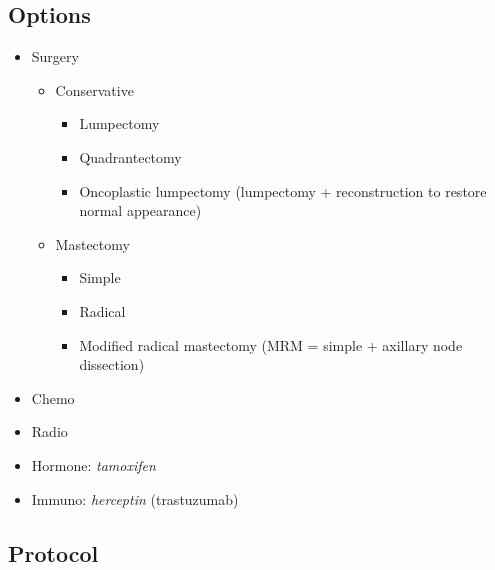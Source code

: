\documentclass[
  14pt,
]{memoir}
\providecommand{\tightlist}{%
  \setlength{\itemsep}{0pt}\setlength{\parskip}{0pt}}
\begin{document}
\hypertarget{options}{%
\subsection{Options}\label{options}}

\begin{itemize}
\tightlist
\item
  Surgery

  \begin{itemize}
  \tightlist
  \item
    Conservative

    \begin{itemize}
    \tightlist
    \item
      Lumpectomy
    \item
      Quadrantectomy
    \item
      Oncoplastic lumpectomy (lumpectomy + reconstruction to restore
      normal appearance)
    \end{itemize}
  \item
    Mastectomy

    \begin{itemize}
    \tightlist
    \item
      Simple
    \item
      Radical
    \item
      Modified radical mastectomy (MRM = simple + axillary node
      dissection)
    \end{itemize}
  \end{itemize}
\item
  Chemo
\item
  Radio
\item
  Hormone: \emph{tamoxifen}
\item
  Immuno: \emph{herceptin} (trastuzumab)
\end{itemize}

\hypertarget{protocol}{%
\subsection{Protocol}\label{protocol}}
\end{document}

